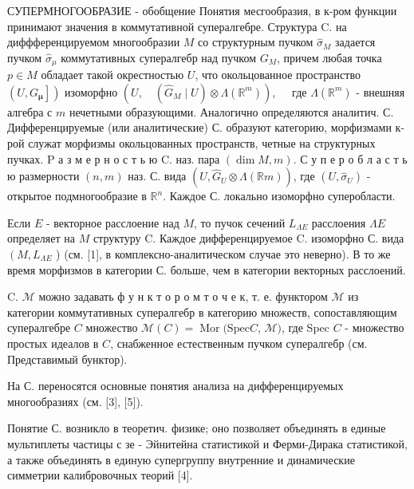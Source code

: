 \documentclass[10pt]{article}
\begin{document}
СУПЕРМНОГООБРАЗИЕ - обобщение Понятия месгообразия, в к-ром функции принимают значения в коммутативной супералгебре. Структура $\mathrm{C}$. на диффференцируемом многообразии $M$ со структурным пучком $\widehat{\sigma}_{M}$ задается пучком $\widehat{\sigma}_{\mu}$ коммутативных супералгебр над пучком $G_{M}$, причем любая точка $p \in M$ обладает такой окрестностью $U$, что окольцованное пространство $\left.\left(U, G_{\boldsymbol{\mu}}\right]\right)$ изоморфно $\left(U, \quad\left(\widehat{G}_{M} \mid U\right) \otimes \Lambda\left(\mathbb{R}^{m}\right)\right), \quad$ где $\Lambda\left(\mathbb{R}^{m}\right)$ - внешняя алгебра с $m$ нечетными образующими. Аналогично определяются аналитич. С. Дифференцируемые (или аналитические) С. образуют категорию, морфизмами к-рой служат морфизмы окольцованных пространств, четные на структурных пучках. $\mathrm{P}$ а з м е р н о с т ь ю $\mathrm{C}$. наз. пара $(\operatorname{dim} M, m)$. С у п е р о б л а с т ь ю размерности $(n, m)$ наз. С. вида $\left(U, \widehat{G}_{U} \otimes \Lambda(\mathbb{R} m)\right)$, где $\left(U, \widehat{\sigma}_{U}\right)$ - открытое подмногообразие в $\mathbb{R}^{n}$. Каждое С. локально изоморфно суперобласти.



Если $E$ - векторное расслоение над $M$, то пучок сечений $L_{\Lambda E}$ расслоения $\Lambda E$ определяет на $M$ структуру C. Каждое дифференцируемое $\mathrm{C}$. изоморфно С. вида $\left(M, L_{\Lambda E}\right.$ ) (см. [1], в комплексно-аналитическом случае это неверно). В то же время морфизмов в категории С. больше, чем в категории векторных расслоений.



C. $\mathscr{M}$ можно задавать ф у н к т о р о м т о ч е к, т. е. функтором $\mathscr{M}$ из категории коммутативных супералгебр в категорию множеств, сопоставляющим супералгебре $C$ множество $\mathscr{M}(C)=\operatorname{Mor}(\mathrm{Spec} C$, $\mathscr{M})$, где Spec $C$ - множество простых идеалов в $C$, снабженное естественным пучком супералгебр (см. Представимый бунктор).



На С. переносятся основные понятия анализа на дифференцируемых многообразиях (см. [3], [5]).



Понятие С. возникло в теоретич. физике; оно позволяет объединять в единые мультиплеты частицы с зе - Эйнитейна статистикой и Ферми-Дирака статистикой, а также объединять в единую супергруппу внутренние и динамические симметрии калибровочных теорий [4].
\end{document}
